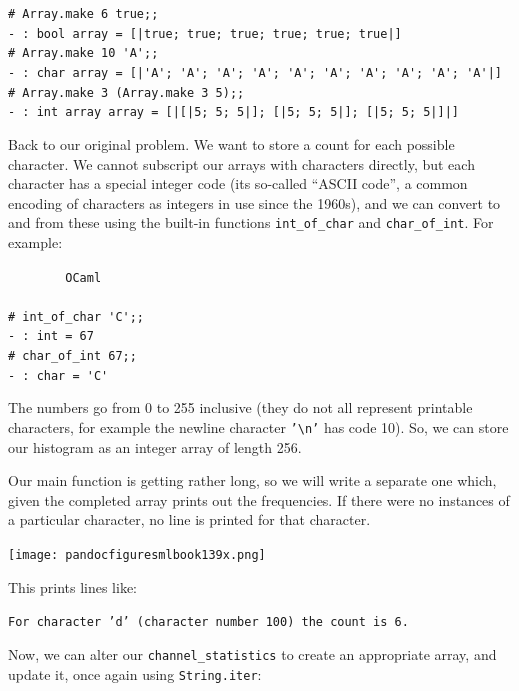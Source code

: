 \documentclass[]{book}
\newcommand{\smspace}{\vspace{4mm}}
\begin{document}
\smspace
\noindent\verb!# Array.make 6 true;;!\\
\noindent\verb!- : bool array = [|true; true; true; true; true; true|]!\\
\noindent\verb!# Array.make 10 'A';;!\\
\noindent\verb!- : char array = [|'A'; 'A'; 'A'; 'A'; 'A'; 'A'; 'A'; 'A'; 'A'; 'A'|]!\\
\noindent\verb!# Array.make 3 (Array.make 3 5);;!\\
\noindent\verb!- : int array array = [|[|5; 5; 5|]; [|5; 5; 5|]; [|5; 5; 5|]|]!
\smspace 

\noindent Back to our original problem. We want to store a count for each possible character. We cannot subscript our arrays with characters directly, but each character has a special integer code (its so-called ``ASCII code'', a common encoding of characters as integers in use since the 1960s), and we can convert to and from these using the built-in functions \texttt{int\_of\_char} and \texttt{char\_of\_int}. For example:

\smspace
\noindent\verb!        OCaml!\\
\noindent\\
\noindent\verb!# int_of_char 'C';;!\\
\noindent\verb!- : int = 67!\\
\noindent\verb!# char_of_int 67;;!\\
\noindent\verb!- : char = 'C'!\vphantom{g}
\smspace

\noindent The numbers go from 0 to 255 inclusive (they do not all represent printable characters, for example the newline character \texttt{'\textbackslash n'} has code 10). So, we can store our histogram as an integer array of length 256.

Our main function is getting rather long, so we will write a separate one which, given the completed array prints out the frequencies. If there were no instances of a particular character, no line is printed for that character.

\medskip
\begin{center}
\noindent\texttt{[image: pandocfiguresmlbook139x.png]}
\end{center}
\medskip

\noindent This prints lines like:

\smspace
\texttt{For character 'd' (character number 100) the count is 6.}
\smspace

\noindent Now, we can alter our \texttt{channel\_statistics} to create an appropriate array, and update it, once again using \texttt{String.iter}: 
\end{document}

